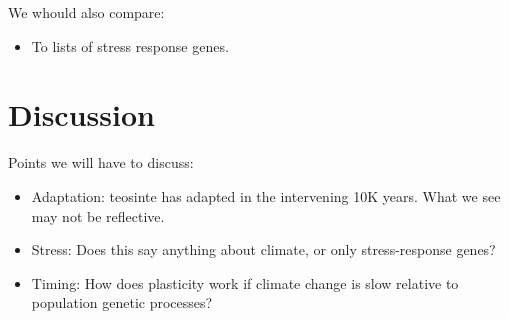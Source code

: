 \documentclass{article}
\begin{document}
We whould also compare:
\begin{itemize}
\item To lists of stress response genes.
\end{itemize}

\section{Discussion}


Points we will have to discuss: %
\begin{itemize}
\item Adaptation: teosinte has adapted in the intervening 10K years. What we see may not be reflective.
\item Stress: Does this say anything about climate, or only stress-response genes?
\item Timing: How does plasticity work if climate change is slow relative to population genetic processes?
\end{itemize}



\end{document}

